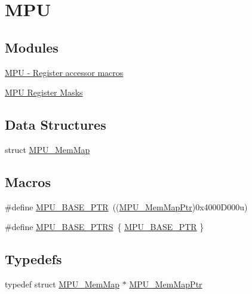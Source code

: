 \hypertarget{group___m_p_u___peripheral}{}\section{M\+P\+U}
\label{group___m_p_u___peripheral}
\subsection*{Modules}
\begin{DoxyCompactItemize}
\item 
\hyperlink{group___m_p_u___register___accessor___macros}{M\+P\+U -\/ Register accessor macros}
\item 
\hyperlink{group___m_p_u___register___masks}{M\+P\+U Register Masks}
\end{DoxyCompactItemize}
\subsection*{Data Structures}
\begin{DoxyCompactItemize}
\item 
struct \hyperlink{struct_m_p_u___mem_map}{M\+P\+U\+\_\+\+Mem\+Map}
\end{DoxyCompactItemize}
\subsection*{Macros}
\begin{DoxyCompactItemize}
\item 
\#define \hyperlink{group___m_p_u___peripheral_gae2d60f80178d84225d77e5f0214d1f1d}{M\+P\+U\+\_\+\+B\+A\+S\+E\+\_\+\+P\+T\+R}~((\hyperlink{group___m_p_u___peripheral_gac3cd3449552560380e80c90b2207d18b}{M\+P\+U\+\_\+\+Mem\+Map\+Ptr})0x4000\+D000u)
\item 
\#define \hyperlink{group___m_p_u___peripheral_ga78460c4504e0b1effc8715d3fdb92f25}{M\+P\+U\+\_\+\+B\+A\+S\+E\+\_\+\+P\+T\+R\+S}~\{ \hyperlink{group___m_p_u___peripheral_gae2d60f80178d84225d77e5f0214d1f1d}{M\+P\+U\+\_\+\+B\+A\+S\+E\+\_\+\+P\+T\+R} \}
\end{DoxyCompactItemize}
\subsection*{Typedefs}
\begin{DoxyCompactItemize}
\item 
typedef struct \hyperlink{struct_m_p_u___mem_map}{M\+P\+U\+\_\+\+Mem\+Map} $\ast$ \hyperlink{group___m_p_u___peripheral_gac3cd3449552560380e80c90b2207d18b}{M\+P\+U\+\_\+\+Mem\+Map\+Ptr}
\end{DoxyCompactItemize}


